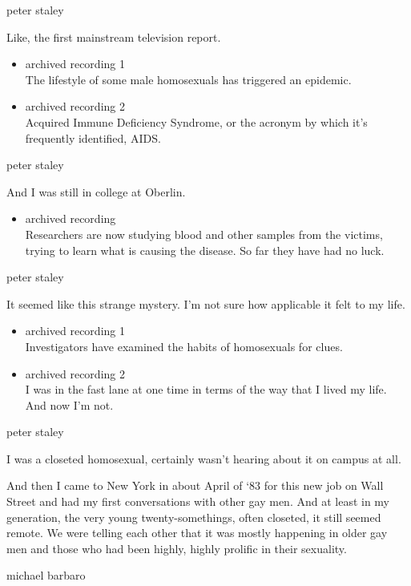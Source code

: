 peter staley

Like, the first mainstream television report.

\begin{itemize}
\item
  archived recording 1\\
  The lifestyle of some male homosexuals has triggered an epidemic.
\item
  archived recording 2\\
  Acquired Immune Deficiency Syndrome, or the acronym by which it's
  frequently identified, AIDS.
\end{itemize}

peter staley

And I was still in college at Oberlin.

\begin{itemize}
\tightlist
\item
  archived recording\\
  Researchers are now studying blood and other samples from the victims,
  trying to learn what is causing the disease. So far they have had no
  luck.
\end{itemize}

peter staley

It seemed like this strange mystery. I'm not sure how applicable it felt
to my life.

\begin{itemize}
\item
  archived recording 1\\
  Investigators have examined the habits of homosexuals for clues.
\item
  archived recording 2\\
  I was in the fast lane at one time in terms of the way that I lived my
  life. And now I'm not.
\end{itemize}

peter staley

I was a closeted homosexual, certainly wasn't hearing about it on campus
at all.

And then I came to New York in about April of `83 for this new job on
Wall Street and had my first conversations with other gay men. And at
least in my generation, the very young twenty-somethings, often
closeted, it still seemed remote. We were telling each other that it was
mostly happening in older gay men and those who had been highly, highly
prolific in their sexuality.

michael barbaro

